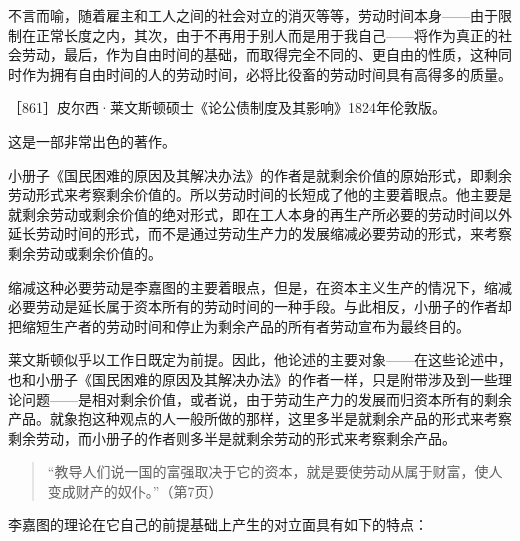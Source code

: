 不言而喻，随着雇主和工人之间的社会对立的消灭等等，劳动时间本身——由于限制在正常长度之内，其次，由于不再用于别人而是用于我自己——将作为真正的社会劳动，最后，作为自由时间的基础，而取得完全不同的、更自由的性质，这种同时作为拥有自由时间的人的劳动时间，必将比役畜的劳动时间具有高得多的质量。


［861］皮尔西·莱文斯顿硕士《论公债制度及其影响》1824年伦敦版。

这是一部非常出色的著作。

小册子《国民困难的原因及其解决办法》的作者是就剩余价值的原始形式，即剩余劳动形式来考察剩余价值的。所以劳动时间的长短成了他的主要着眼点。他主要是就剩余劳动或剩余价值的绝对形式，即在工人本身的再生产所必要的劳动时间以外延长劳动时间的形式，而不是通过劳动生产力的发展缩减必要劳动的形式，来考察剩余劳动或剩余价值的。

缩减这种必要劳动是李嘉图的主要着眼点，但是，在资本主义生产的情况下，缩减必要劳动是延长属于资本所有的劳动时间的一种手段。与此相反，小册子的作者却把缩短生产者的劳动时间和停止为剩余产品的所有者劳动宣布为最终目的。

莱文斯顿似乎以工作日既定为前提。因此，他论述的主要对象——在这些论述中，也和小册子《国民困难的原因及其解决办法》的作者一样，只是附带涉及到一些理论问题——是相对剩余价值，或者说，由于劳动生产力的发展而归资本所有的剩余产品。就象抱这种观点的人一般所做的那样，这里多半是就剩余产品的形式来考察剩余劳动，而小册子的作者则多半是就剩余劳动的形式来考察剩余产品。

\begin{quote}{“教导人们说一国的富强取决于它的资本，就是要使劳动从属于财富，使人变成财产的奴仆。”（第7页）}\end{quote}

李嘉图的理论在它自己的前提基础上产生的对立面具有如下的特点：

